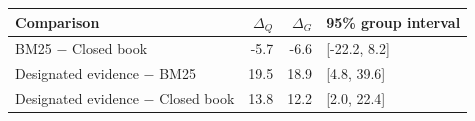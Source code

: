 \begin{tabular}{lrrl}
\toprule
Comparison & $\Delta_Q$ & $\Delta_G$ & 95\% group interval \\
\midrule
BM25 $-$ Closed book & -5.7 & -6.6 & [-22.2, 8.2] \\
Designated evidence $-$ BM25 & 19.5 & 18.9 & [4.8, 39.6] \\
Designated evidence $-$ Closed book & 13.8 & 12.2 & [2.0, 22.4] \\
\bottomrule
\end{tabular}
